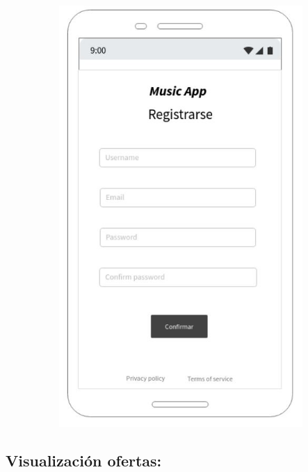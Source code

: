 \begin{figure}[h!]
 \centering
\includegraphics[width=12cm, height=16cm,keepaspectratio=true]{Desarrollo/Interfaces/Mockup/imgs/wire2.JPG}
\end{figure}
\newpage
\subsection{Visualización ofertas:}

